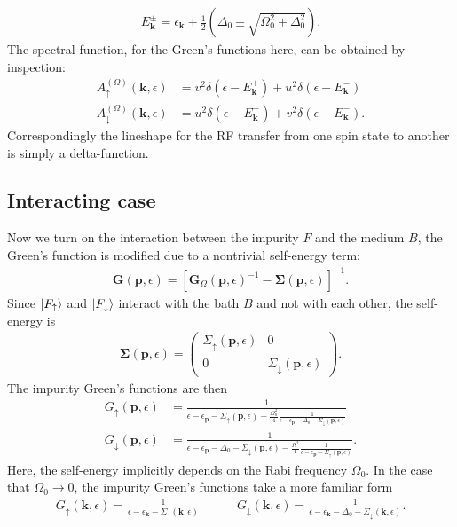 \documentclass{article}
\theoremstyle{definition}
\newcommand{\f}[2]{\frac{#1}{#2}}
\newcommand{\lp}{\left(}
\newcommand{\rp}{\right)}
\newcommand{\lb}{\left[}
\newcommand{\rb}{\right]}
\begin{document}
\begin{align}
E^{\pm}_\mathbf{k} = \epsilon_\mathbf{k} + \f{1}{2} \lp \Delta_0 \pm \sqrt{\Omega_0^2 + \Delta_0^2} \rp.
\end{align}
The spectral function, for the Green's functions here, can be obtained by inspection:
\begin{align}
A^{(\Omega)}_\uparrow (\mathbf{k}, \epsilon) &= v^2 \delta(\epsilon - E_\mathbf{k}^+) 
+ u^2 \delta(\epsilon - E_\mathbf{k}^-) \\ 
A^{(\Omega)}_\downarrow (\mathbf{k}, \epsilon) &= u^2 \delta(\epsilon - E_\mathbf{k}^+) 
+ v^2 \delta(\epsilon - E_\mathbf{k}^-).
\end{align}
Correspondingly the lineshape for the RF transfer from one spin state to another is simply a delta-function. 


\subsection{Interacting case}

Now we turn on the interaction between the impurity $F$ and the medium $B$, the Green's function is modified due to a nontrivial self-energy term:
\begin{align}
\mathbf{G}(\mathbf{p}, \epsilon) = \lb \mathbf{G}_\Omega (\mathbf{p}, \epsilon)^{-1} - \mathbf{\Sigma}(\mathbf{p}, \epsilon) \rb^{-1}. 
\end{align}
Since $\ket{F_\uparrow}$ and $\ket{F_\downarrow}$ interact with the bath $B$ and not with each other, the self-energy is 
\begin{align}
\mathbf{\Sigma}(\mathbf{p}, \epsilon) = 
\begin{pmatrix}
\Sigma_\uparrow(\mathbf{p}, \epsilon) & 0 \\ 
0 & \Sigma_\downarrow(\mathbf{p}, \epsilon)
\end{pmatrix}.
\end{align}
The impurity Green's functions are then 
\begin{align}
G_\uparrow(\mathbf{p}, \epsilon) 
&=  \f{1}{ \epsilon - \epsilon_\mathbf{p} - \Sigma_\uparrow(\mathbf{p}, \epsilon) - \f{\Omega_0^2}{4} \f{1}{\epsilon - \epsilon_\mathbf{p} - \Delta_0 - \Sigma_\downarrow(\mathbf{p}, \epsilon)}}\\ 
G_\downarrow(\mathbf{p}, \epsilon) 
&=  \f{1}{\epsilon - \epsilon_\mathbf{p} -\Delta_0 - \Sigma_\downarrow(\mathbf{p}, \epsilon) - \f{\Omega^2}{4} \f{1}{\epsilon - \epsilon_\mathbf{p} - \Sigma_\uparrow(\mathbf{p}, \epsilon)}}.
\end{align}
Here, the self-energy implicitly depends on the Rabi frequency $\Omega_0$. In the case that $\Omega_0 \to 0$, the impurity Green's functions take a more familiar form
\begin{align}\label{eq:zero-omega}
G_\uparrow(\mathbf{k}, \epsilon) 
=  \f{1}{ \epsilon - \epsilon_\mathbf{k} - \Sigma_\uparrow(\mathbf{k}, \epsilon) }
\quad\quad\quad
G_\downarrow(\mathbf{k}, \epsilon) 
=  \f{1}{\epsilon - \epsilon_\mathbf{k} -\Delta_0 - \Sigma_\downarrow(\mathbf{k}, \epsilon) }.
\end{align}
\end{document}
